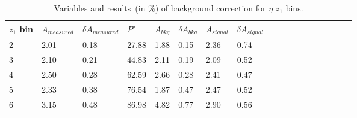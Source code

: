 
\begin{table}[H]\footnotesize
\centering
\begin{tabular}{|l|l|l|l|l|l|l|l|l|l|l|l|l|l|l|l|l|l|}
\\ \hline
$z_1$ bin & $A_{measured}$ & $\delta A_{measured}$ & $P^{\star}$  & $A_{bkg}$ & $\delta A_{bkg}$ & $A_{signal}$ & $\delta A_{signal}$ \\ \hline
2 & 2.01 & 0.18 & 27.88 & 1.88 & 0.15 & 2.36  & 0.74 \\ \hline 
3 & 2.10 & 0.21 & 44.83 & 2.11 & 0.19 & 2.09 & 0.52 \\ \hline 
4 & 2.50 & 0.28 & 62.59 & 2.66 & 0.28 & 2.41 & 0.47 \\ \hline 
5 & 2.33 & 0.38 & 76.54 & 1.87 & 0.47 & 2.47 & 0.52 \\ \hline 
6 & 3.15 & 0.48 & 86.98 & 4.82 & 0.77 & 2.90  & 0.56 \\ \hline 
\end{tabular}
\caption{Variables and results~(in $\%$) of background correction for $\eta$ $z_1$ bins. }
\label{tab:etasinzbkgcor}
\end{table}

